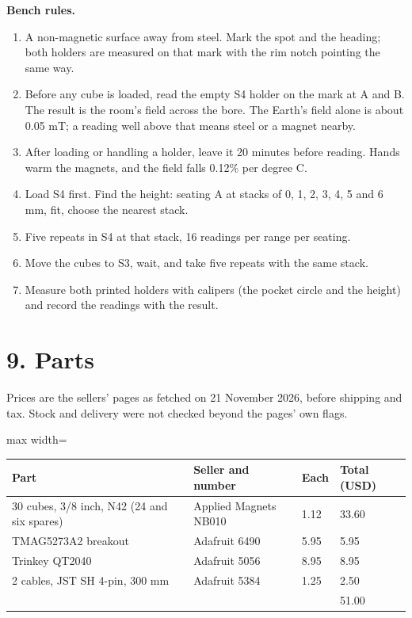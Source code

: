 \documentclass[11pt,a4paper]{article}
\begin{document}
{\bfseries\boldmath Bench rules.}

\begin{enumerate}
\item{} A non-magnetic surface away from steel. Mark the spot and the heading; both holders are measured on that mark with the rim notch pointing the same way.
\item{} Before any cube is loaded, read the empty S4 holder on the mark at A and B. The result is the room's field across the bore. The Earth's field alone is about 0.05 mT; a reading well above that means steel or a magnet nearby.
\item{} After loading or handling a holder, leave it 20 minutes before reading. Hands warm the magnets, and the field falls 0.12\% per degree C.
\item{} Load S4 first. Find the height: seating A at stacks of 0, 1, 2, 3, 4, 5 and 6 mm, fit, choose the nearest stack.
\item{} Five repeats in S4 at that stack, 16 readings per range per seating.
\item{} Move the cubes to S3, wait, and take five repeats with the same stack.
\item{} Measure both printed holders with calipers (the pocket circle and the height) and record the readings with the result.
\end{enumerate}


\section*{9. Parts}
Prices are the sellers' pages as fetched on 21 November 2026, before shipping and tax. Stock and delivery were not checked beyond the pages' own flags.

\begin{center}
\begin{adjustbox}{max width=\linewidth}
\begin{tabular}{llll}
\hline
{}{\bfseries\boldmath Part} & {\bfseries\boldmath Seller and number} & {\bfseries\boldmath Each} & {\bfseries\boldmath Total (USD)} \\
\hline
{}30 cubes, 3/8 inch, N42 (24 and six spares) & Applied Magnets NB010 & 1.12 & 33.60 \\
{}TMAG5273A2 breakout & Adafruit 6490 & 5.95 & 5.95 \\
{}Trinkey QT2040 & Adafruit 5056 & 8.95 & 8.95 \\
{}2 cables, JST SH 4-pin, 300 mm & Adafruit 5384 & 1.25 & 2.50 \\
{} &  &  & 51.00 \\
\hline
\end{tabular}
\end{adjustbox}
\end{center}
\end{document}
